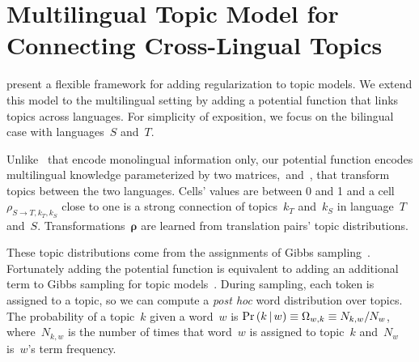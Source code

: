 \section{Multilingual Topic Model for Connecting Cross-Lingual Topics}
\label{sec:model}


%

 present a flexible framework for adding
regularization to topic models.  We extend this model to the
multilingual setting by adding a potential function that links topics
across languages.  For simplicity of exposition, we focus on the
bilingual case with languages~$S$ and~$T$.



Unlike~ that encode monolingual information only, our potential function encodes multilingual knowledge parameterized
by two matrices,~\rhost and~\rhots, that transform topics between the two languages.
Cells' values are between 0 and 1 and a cell $\rho_{S \rightarrow T, k_T, k_S}$ close to one is a strong connection of topics~$k_T$ and~$k_S$ in language~$T$ and~$S$.  
Transformations~$\bm{\rho}$ are learned from translation pairs' topic
distributions.

These topic distributions come from the assignments of Gibbs
sampling~\cite{griffiths-2004-lda-gibbs}.
%
Fortunately adding the potential function is equivalent to adding an
additional term to Gibbs sampling for topic
models~\cite{yang-2015-knowledge}.
%
During sampling, each token is assigned
to a topic, so we can compute a \emph{post
  hoc} word distribution over topics. The probability of a topic~$k$ given a word~$w$ is $\Pr \left( k \,|\, w \right) \equiv \Omega_{w,k}
\equiv N_{k,w} / N_w$, where~$N_{k,w}$ is the number of times that
word~$w$ is assigned to topic~$k$ and~$N_w$ is~$w$'s term frequency.

